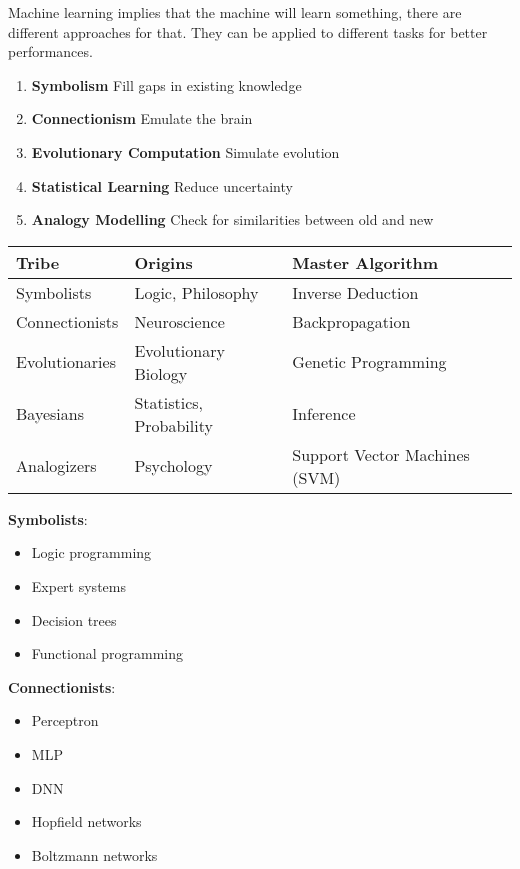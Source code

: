 Machine learning implies that the machine will learn something, there are different approaches for that. They can be applied to different tasks for better performances.

\begin{enumerate}
    \item \textbf{Symbolism} \ra Fill gaps in existing knowledge
    \item \textbf{Connectionism} \ra Emulate the brain
    \item \textbf{Evolutionary Computation} \ra Simulate evolution
    \item \textbf{Statistical Learning} \ra Reduce uncertainty
    \item \textbf{Analogy Modelling} \ra Check for similarities between old and new
\end{enumerate}

\begin{table}[h!]
\centering
\begin{tabular}{|l|l|l|}
\hline
\textbf{Tribe} & \textbf{Origins} & \textbf{Master Algorithm} \\ \hline
Symbolists & Logic, Philosophy & Inverse Deduction \\ \hline
Connectionists & Neuroscience & Backpropagation \\ \hline
Evolutionaries & Evolutionary Biology & Genetic Programming \\ \hline
Bayesians & Statistics, Probability & Inference \\ \hline
Analogizers & Psychology & Support Vector Machines (SVM) \\ \hline
\end{tabular}
\end{table}

\textbf{Symbolists}:
\begin{itemize}
    \item Logic programming
    \item Expert systems
    \item Decision trees
    \item Functional programming
\end{itemize}

\textbf{Connectionists}:
\begin{itemize}
    \item Perceptron
    \item MLP
    \item DNN
    \item Hopfield networks
    \item Boltzmann networks
\end{itemize}

